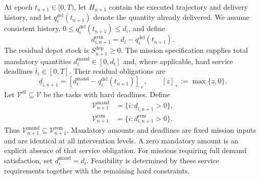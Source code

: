 At epoch $t_{n+1}\in[0,T)$, let $H_{n+1}$ contain the executed trajectory
and delivery history, and let $q_i^{\mathrm{del}}(t_{n+1})$ denote the
quantity already delivered. We assume consistent history,
$0\le q_i^{\mathrm{del}}(t_{n+1})\le d_i$, and define
\begin{equation}
d_{i,n+1}^{\mathrm{rem}}
=d_i-q_i^{\mathrm{del}}(t_{n+1}).
\label{eq:residual_demand}
\end{equation}
The residual depot stock is $S_{n+1}^{\mathrm{dep}}\ge0$.
The mission specification supplies total mandatory quantities
$d_i^{\mathrm{mand}}\in[0,d_i]$ and, where applicable, hard service
deadlines $\bar t_i\in[0,T]$. Their residual obligations are
\begin{equation}
\underline d_{i,n+1}
=\left[d_i^{\mathrm{mand}}
-q_i^{\mathrm{del}}(t_{n+1})\right]_+,
\qquad [z]_+:=\max\{z,0\}.
\label{eq:mandatory_residual}
\end{equation}
Let $\mathcal V^{\mathrm{dl}}\subseteq\mathcal V$ be the tasks with hard
deadlines. Define
\begin{align}
\mathcal V_{n+1}^{\mathrm{mand}}
&=\{i:\underline d_{i,n+1}>0\},
\label{eq:mandatory_tasks}\\
\mathcal V_{n+1}^{\mathrm{rem}}
&=\{i:d_{i,n+1}^{\mathrm{rem}}>0\}.
\label{eq:remaining_tasks}
\end{align}
Thus $\mathcal V_{n+1}^{\mathrm{mand}}\subseteq
\mathcal V_{n+1}^{\mathrm{rem}}$. Mandatory amounts and deadlines
are fixed mission inputs and are identical at all intervention levels.
A zero mandatory amount is an explicit absence of that service obligation.
For missions requiring full demand satisfaction, set
$d_i^{\mathrm{mand}}=d_i$. Feasibility is determined by these service
requirements together with the remaining hard constraints.

